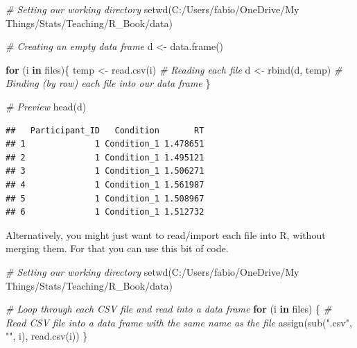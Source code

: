 \documentclass[
]{book}
\newenvironment{Shaded}{\begin{snugshade}}{\end{snugshade}}
\newcommand{\CommentTok}[1]{\textcolor[rgb]{0.56,0.35,0.01}{\textit{#1}}}
\newcommand{\ControlFlowTok}[1]{\textcolor[rgb]{0.13,0.29,0.53}{\textbf{#1}}}
\newcommand{\FunctionTok}[1]{\textcolor[rgb]{0.00,0.00,0.00}{#1}}
\newcommand{\NormalTok}[1]{#1}
\newcommand{\OtherTok}[1]{\textcolor[rgb]{0.56,0.35,0.01}{#1}}
\newcommand{\StringTok}[1]{\textcolor[rgb]{0.31,0.60,0.02}{#1}}
\begin{document}
\begin{Shaded}
\begin{Highlighting}[]
\CommentTok{\# Setting our working directory}
\FunctionTok{setwd}\NormalTok{(}\StringTok{\textquotesingle{}C:/Users/fabio/OneDrive/My Things/Stats/Teaching/R\_Book/data\textquotesingle{}}\NormalTok{)}

\CommentTok{\# Creating an empty data frame}
\NormalTok{d }\OtherTok{\textless{}{-}} \FunctionTok{data.frame}\NormalTok{()}

\ControlFlowTok{for}\NormalTok{ (i }\ControlFlowTok{in}\NormalTok{ files)\{}
\NormalTok{  temp }\OtherTok{\textless{}{-}} \FunctionTok{read.csv}\NormalTok{(i) }\CommentTok{\# Reading each file}
\NormalTok{  d }\OtherTok{\textless{}{-}} \FunctionTok{rbind}\NormalTok{(d, temp)  }\CommentTok{\# Binding (by row) each file into our data frame}
\NormalTok{\}}

\CommentTok{\# Preview}
\FunctionTok{head}\NormalTok{(d)}
\end{Highlighting}
\end{Shaded}

\begin{verbatim}
##   Participant_ID   Condition       RT
## 1              1 Condition_1 1.478651
## 2              1 Condition_1 1.495121
## 3              1 Condition_1 1.506271
## 4              1 Condition_1 1.561987
## 5              1 Condition_1 1.508967
## 6              1 Condition_1 1.512732
\end{verbatim}

Alternatively, you might just want to read/import each file into R, without merging them.
For that you can use this bit of code.

\begin{Shaded}
\begin{Highlighting}[]
\CommentTok{\# Setting our working directory}
\FunctionTok{setwd}\NormalTok{(}\StringTok{\textquotesingle{}C:/Users/fabio/OneDrive/My Things/Stats/Teaching/R\_Book/data\textquotesingle{}}\NormalTok{)}

\CommentTok{\# Loop through each CSV file and read into a data frame}
\ControlFlowTok{for}\NormalTok{ (i }\ControlFlowTok{in}\NormalTok{ files) \{}
  \CommentTok{\# Read CSV file into a data frame with the same name as the file}
  \FunctionTok{assign}\NormalTok{(}\FunctionTok{sub}\NormalTok{(}\StringTok{".csv"}\NormalTok{, }\StringTok{""}\NormalTok{, i), }\FunctionTok{read.csv}\NormalTok{(i))}
\NormalTok{\}}
\end{Highlighting}
\end{Shaded}
\end{document}
